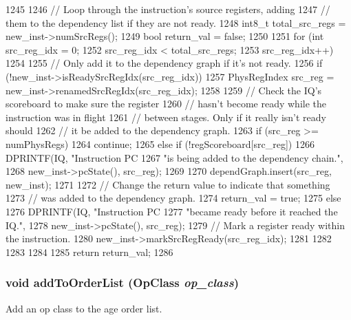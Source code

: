\begin{DoxyCode}
1245 {
1246     // Loop through the instruction's source registers, adding
1247     // them to the dependency list if they are not ready.
1248     int8_t total_src_regs = new_inst->numSrcRegs();
1249     bool return_val = false;
1250 
1251     for (int src_reg_idx = 0;
1252          src_reg_idx < total_src_regs;
1253          src_reg_idx++)
1254     {
1255         // Only add it to the dependency graph if it's not ready.
1256         if (!new_inst->isReadySrcRegIdx(src_reg_idx)) {
1257             PhysRegIndex src_reg = new_inst->renamedSrcRegIdx(src_reg_idx);
1258 
1259             // Check the IQ's scoreboard to make sure the register
1260             // hasn't become ready while the instruction was in flight
1261             // between stages.  Only if it really isn't ready should
1262             // it be added to the dependency graph.
1263             if (src_reg >= numPhysRegs) {
1264                 continue;
1265             } else if (!regScoreboard[src_reg]) {
1266                 DPRINTF(IQ, "Instruction PC %
1267                         "is being added to the dependency chain.\n",
1268                         new_inst->pcState(), src_reg);
1269 
1270                 dependGraph.insert(src_reg, new_inst);
1271 
1272                 // Change the return value to indicate that something
1273                 // was added to the dependency graph.
1274                 return_val = true;
1275             } else {
1276                 DPRINTF(IQ, "Instruction PC %
1277                         "became ready before it reached the IQ.\n",
1278                         new_inst->pcState(), src_reg);
1279                 // Mark a register ready within the instruction.
1280                 new_inst->markSrcRegReady(src_reg_idx);
1281             }
1282         }
1283     }
1284 
1285     return return_val;
1286 }
\end{DoxyCode}
\hypertarget{classInstructionQueue_aa1de4a5c314cc1d0efaf045e05e47165}{
\subsubsection[{addToOrderList}]{\setlength{\rightskip}{0pt plus 5cm}void addToOrderList (OpClass {\em op\_\-class})}}
\label{classInstructionQueue_aa1de4a5c314cc1d0efaf045e05e47165}
Add an op class to the age order list. 



